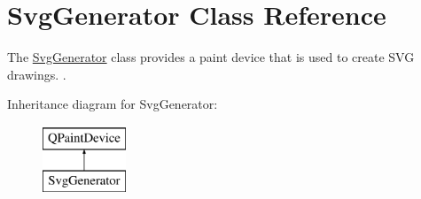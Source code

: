 \hypertarget{class_svg_generator}{}\section{Svg\+Generator Class Reference}
\label{class_svg_generator}


The \hyperlink{class_svg_generator}{Svg\+Generator} class provides a paint device that is used to create S\+VG drawings. .  


Inheritance diagram for Svg\+Generator\+:\begin{figure}[H]
\begin{center}
\leavevmode
\includegraphics[height=2.000000cm]{class_svg_generator}
\end{center}
\end{figure}
